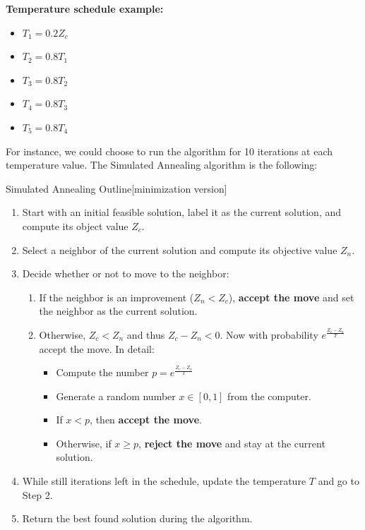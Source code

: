 \textbf{Temperature schedule example:}
\begin{itemize}
\item  $T_1 = 0.2 Z_c$
\item $T_2 = 0.8 T_1$
\item $T_3 = 0.8 T_2$
\item $T_4 = 0.8 T_3$
\item $T_5 = 0.8 T_4$
\end{itemize}
For instance, we could choose to run the algorithm for 10 iterations at each temperature value.  The Simulated Annealing algorithm is the following:
\begin{general}{Simulated Annealing Outline}{[minimization version]}
\begin{enumerate}
\item Start with an initial feasible solution, label it as the current solution, and compute its object value $Z_c$.
\item Select a neighbor of the current solution and compute its objective value $Z_n$.
\item Decide whether or not to move to the neighbor:
\begin{enumerate}
\item If the neighbor is an improvement ($Z_n < Z_c$), \textbf{accept the move} and set the neighbor as the current solution.\\
\item Otherwise, $Z_c < Z_n$ and thus $Z_c - Z_n < 0$.   Now with probability $e^{\frac{Z_c - Z_n}{T}}$ accept the move.  In detail:  
\begin{itemize}
\item Compute the number $p = e^{\frac{Z_c - Z_n}{T}}$
\item Generate a random number $x \in [0,1]$ from the computer.
\item If $x < p$, then \textbf{accept the move}.
\item Otherwise, if $x \geq p$, \textbf{reject the move} and stay at the current solution.
\end{itemize}
\end{enumerate}
\item While still iterations left in the schedule, update the temperature $T$ and go to Step 2.
\item Return the best found solution during the algorithm.
\end{enumerate}
\end{general}




